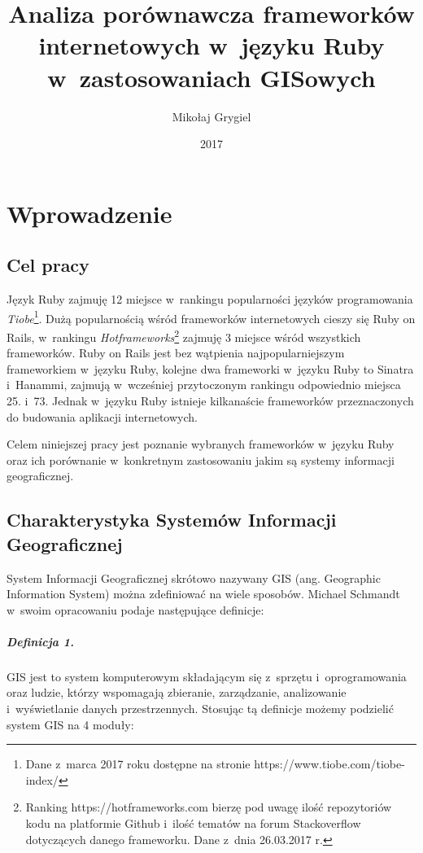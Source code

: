 \documentclass[printmode]{mgr}
\date{2017}
\title{Analiza porównawcza frameworków internetowych w~języku Ruby w~zastosowaniach GISowych}
\author{Mikołaj Grygiel}
\begin{document}


\maketitle

\tableofcontents

\chapter{Wprowadzenie}
\section{Cel pracy}
Język Ruby zajmuję 12 miejsce w~rankingu popularności języków programowania \emph{Tiobe}\footnote{Dane z~marca 2017 roku dostępne na stronie https://www.tiobe.com/tiobe-index/}. Dużą popularnością wśród frameworków internetowych cieszy się Ruby on Rails, w~rankingu \emph{Hotframeworks}\footnote{Ranking https://hotframeworks.com bierzę pod uwagę ilość repozytoriów kodu na platformie Github i~ilość tematów na forum Stackoverflow dotyczących danego frameworku. Dane z~dnia 26.03.2017 r.} zajmuję 3 miejsce wśród wszystkich frameworków. Ruby on Rails jest bez wątpienia najpopularniejszym frameworkiem w~języku Ruby, kolejne dwa frameworki w~języku Ruby to Sinatra i~Hanammi, zajmują w~wcześniej przytoczonym rankingu odpowiednio miejsca 25. i~73. Jednak w~języku Ruby istnieje kilkanaście frameworków przeznaczonych do budowania aplikacji internetowych.



Celem niniejszej pracy jest poznanie wybranych frameworków w~języku Ruby oraz ich porównanie w~konkretnym zastosowaniu jakim są  systemy informacji geograficznej.

\section{Charakterystyka Systemów Informacji Geograficznej}
System Informacji Geograficznej skrótowo nazywany GIS (ang. Geographic Information System) można zdefiniować na wiele sposobów. Michael Schmandt w~swoim opracowaniu\cite{gis_introduction} podaje następujące definicje:

\paragraph*{Definicja 1.}
GIS jest to system komputerowym składającym się z~sprzętu i~oprogramowania oraz ludzie, którzy wspomagają zbieranie, zarządzanie, analizowanie i~wyświetlanie danych przestrzennych. Stosując tą definicje możemy podzielić system GIS na 4 moduły:
\end{document}
